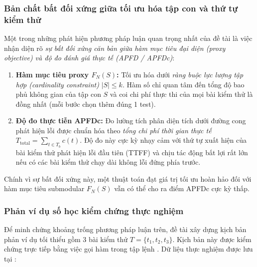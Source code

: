 \subsubsection{Bản chất bất đối xứng giữa tối ưu hóa tập con và thứ tự kiểm thử}
\label{subsubsec:gap_nature}

Một trong những phát hiện phương pháp luận quan trọng nhất của đề tài là việc nhận diện rõ \textit{sự bất đối xứng căn bản giữa hàm mục tiêu đại diện (proxy objective) và độ đo đánh giá thực tế (APFD / APFDc)}:
\begin{enumerate}
    \item \textbf{Hàm mục tiêu proxy $F_N(S)$:} Tối ưu hóa dưới \textit{ràng buộc lực lượng tập hợp (cardinality constraint)} $|S| \le k$. Hàm số chỉ quan tâm đến tổng độ bao phủ không gian của tập con $S$ và coi chi phí thực thi của mọi bài kiểm thử là đồng nhất (mỗi bước chọn thêm đúng 1 test).
    \item \textbf{Độ đo thực tiễn APFDc:} Đo lường tích phân diện tích dưới đường cong phát hiện lỗi được chuẩn hóa theo \textit{tổng chi phí thời gian thực tế} $T_{\text{total}} = \sum_{t \in T_b} c(t)$. Độ đo này cực kỳ nhạy cảm với thứ tự xuất hiện của bài kiểm thử phát hiện lỗi đầu tiên (TTFF) và chịu tác động bất lợi rất lớn nếu có các bài kiểm thử chạy dài không lỗi đứng phía trước.
\end{enumerate}

Chính vì sự bất đối xứng này, một thuật toán đạt giá trị tối ưu hoàn hảo đối với hàm mục tiêu submodular $F_N(S)$ vẫn có thể cho ra điểm APFDc cực kỳ thấp.

\subsubsection{Phản ví dụ số học kiểm chứng thực nghiệm}
\label{subsubsec:counterexample_proof}

Để minh chứng khoảng trống phương pháp luận trên, đề tài xây dựng kịch bản phản ví dụ tối thiểu gồm 3 bài kiểm thử $T = \{t_1, t_2, t_3\}$. Kịch bản này được kiểm chứng trực tiếp bằng việc gọi hàm  trong tập lệnh . Dữ liệu thực nghiệm được lưu tại :

